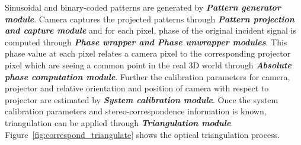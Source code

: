 Sinusoidal and binary-coded patterns are generated by \textit{\textbf{Pattern generator module}}. Camera captures the projected patterns through \textit{\textbf{Pattern projection and capture module}} and for each pixel, phase of the original incident signal is computed through \textit{\textbf{Phase wrapper and Phase unwrapper modules}}. This phase value at each pixel relates a camera pixel to the corresponding projector pixel which are seeing a common point in the real 3D world through \textit{\textbf{Absolute phase computation module}}. Further the calibration parameters for camera, projector and relative orientation and position of camera with respect to projector are estimated by \textit{\textbf{System calibration module}}. Once the system calibration parameters and stereo-correspondence information is known, triangulation can be applied through \textit{\textbf{Triangulation module}}. Figure~\ref{fig:correspond_triangulate} shows the optical triangulation process.\newline 
